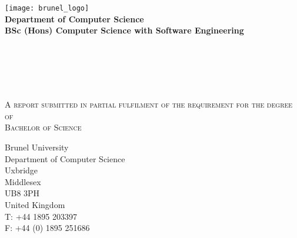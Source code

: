 %
%

\begin{titlepage}
  \begin{center}
    \texttt{[image: brunel\_logo]}\\[1cm]

    \textbf{\large Department of Computer Science}\\[0.5cm]
    \textbf{\large BSc (Hons) Computer Science with Software Engineering}\\[0.5cm]
    \AcademicYear\\[2.5cm]

    \begin{doublespace}
      \textbf{\LARGE \Title}\\[2.75cm]
    \end{doublespace}

    \Author\\[0.5cm]
    \StudentId\\

    \vfill
    \textsc{\footnotesize{A report submitted in partial fulfilment of the requirement for the degree of}}\\
    \textsc{\footnotesize{Bachelor of Science}}\\[2.5cm]
  \end{center}

  \begin{flushright}
    \small{Brunel University\\
      Department of Computer Science\\
      Uxbridge\\
      Middlesex\\
      UB8 3PH\\
      United Kingdom\\
      T\@: +44 1895 203397\\
      F\@: +44 (0) 1895 251686\\
    }
  \end{flushright}
\end{titlepage}
